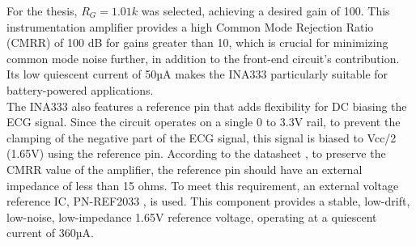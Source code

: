 \noindent For the thesis, \( R_G = 1.01k \) was selected, achieving a desired gain of 100. This instrumentation amplifier provides a high Common Mode Rejection Ratio (CMRR) of 100 dB for gains greater than 10, which is crucial for minimizing common mode noise further, in addition to the front-end circuit's contribution. Its low quiescent current of 50µA makes the INA333 particularly suitable for battery-powered applications.\\

\noindent The INA333 also features a reference pin that adds flexibility for DC biasing the ECG signal. Since the circuit operates on a single 0 to 3.3V rail, to prevent the clamping of the negative part of the ECG signal, this signal is biased to Vcc/2 (1.65V) using the reference pin. According to the datasheet \cite{TI_INA333}, to preserve the CMRR value of the amplifier, the reference pin should have an external impedance of less than 15 ohms. To meet this requirement, an external voltage reference IC, PN-REF2033 \cite{TI_REF2033}, is used. This component provides a stable, low-drift, low-noise, low-impedance 1.65V reference voltage, operating at a quiescent current of 360µA.\\







